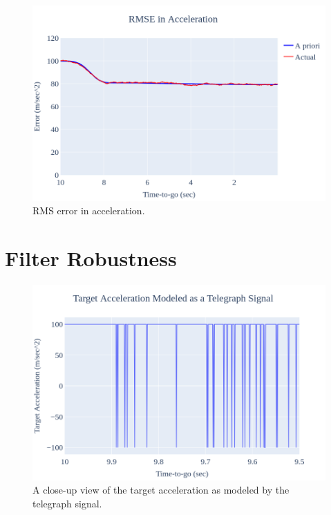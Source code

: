 \documentclass{article}
\begin{document}
\begin{figure}
    \centering
    \includegraphics[width=1\textwidth]{rmse_accel.png}
    \caption{RMS error in acceleration.}
    \label{rmse_accel}
\end{figure}


\section{Filter Robustness}
\begin{figure}
    \centering
    \includegraphics[width=1\textwidth]{fig_tele.png}
    \caption{A close-up view of the target acceleration as modeled by the telegraph signal.}
    \label{telegraph_signal}
\end{figure}
\end{document}
